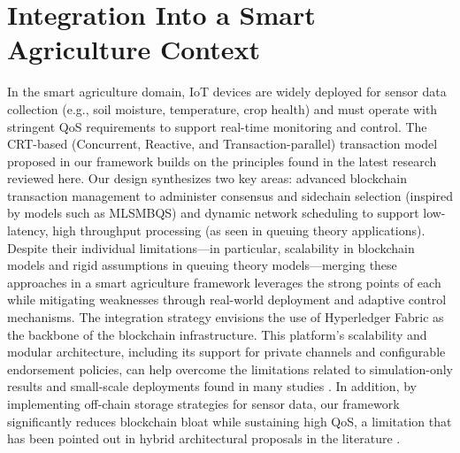 \documentclass[12pt,onecolumn]{IEEEtran} %
\begin{document}
\section*{Integration Into a Smart Agriculture Context}
In the smart agriculture domain, IoT devices are widely deployed for sensor data collection (e.g., soil moisture, temperature, crop health) and must operate with stringent QoS requirements to support real-time monitoring and control. The CRT-based (Concurrent, Reactive, and Transaction-parallel) transaction model proposed in our framework builds on the principles found in the latest research reviewed here. Our design synthesizes two key areas: advanced blockchain transaction management to administer consensus and sidechain selection (inspired by models such as MLSMBQS) and dynamic network scheduling to support low-latency, high throughput processing (as seen in queuing theory applications). Despite their individual limitations---in particular, scalability in blockchain models and rigid assumptions in queuing theory models---merging these approaches in a smart agriculture framework leverages the strong points of each while mitigating weaknesses through real-world deployment and adaptive control mechanisms. The integration strategy envisions the use of Hyperledger Fabric as the backbone of the blockchain infrastructure. This platform's scalability and modular architecture, including its support for private channels and configurable endorsement policies, can help overcome the limitations related to simulation-only results and small-scale deployments found in many studies \cite{pajooh2022experimentalperformanceanalysis}. In addition, by implementing off-chain storage strategies for sensor data, our framework significantly reduces blockchain bloat while sustaining high QoS, a limitation that has been pointed out in hybrid architectural proposals in the literature \cite{haque2024ascalableblockchain}.
\end{document}
